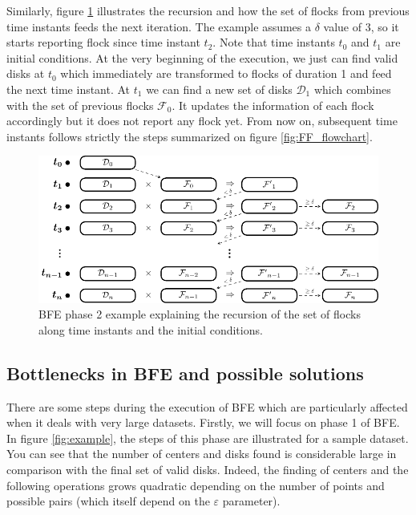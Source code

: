 Similarly, figure \ref{fig:FF_stages} illustrates the recursion and how the set of flocks from previous time instants feeds the next iteration.  The example assumes a $\delta$ value of 3, so it starts reporting flock since time instant $t_2$.  Note that time instants $t_0$ and $t_1$ are initial conditions.  At the very beginning of the execution, we just can find valid disks at $t_0$ which immediately are transformed to flocks of duration 1 and feed the next time instant.  At $t_1$ we can find a new set of disks $\mathcal{D}_1$ which combines with the set of previous flocks $\mathcal{F}_0$.  It updates the information of each flock accordingly but it does not report any flock yet.  From now on, subsequent time instants follows strictly the steps summarized on figure \ref{fig:FF_flowchart}.

\begin{figure}[!ht]
    \centering
    \includegraphics[width=\linewidth]{figures/FF_stages}
    \caption{BFE phase 2 example explaining the recursion of the set of flocks along time instants and the initial conditions.}\label{fig:FF_stages}
\end{figure}

\subsection{Bottlenecks in BFE and possible solutions}
There are some steps during the execution of BFE which are particularly affected when it deals with very large datasets.  Firstly, we will focus on phase 1 of BFE.  In figure \ref{fig:example}, the steps of this phase are illustrated for a sample dataset.  You can see that the number of centers and disks found is considerable large in comparison with the final set of valid disks.  Indeed, the finding of centers and the following operations grows quadratic depending on the number of points and possible pairs (which itself depend on the $\varepsilon$ parameter).   

